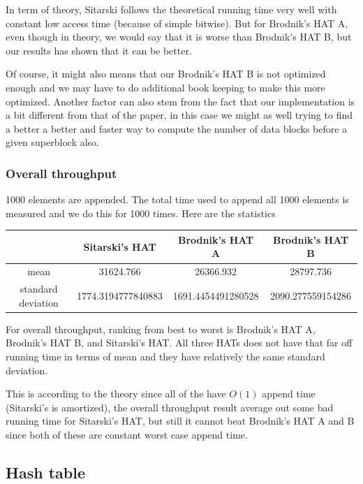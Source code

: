\documentclass{article} %
\begin{document}
    In term of theory, Sitarski follows the theoretical running time very well with constant low access time (because of simple bitwise).
    But for Brodnik's HAT A, even though in theory, we would say that it is worse than Brodnik's HAT B, but our results has shown that it can be better.

    Of course, it might also means that our Brodnik's HAT B is not optimized enough and we may have to do additional book keeping to make this more optimized.
    Another factor can also stem from the fact that our implementation is a bit different from that of the paper, in this case we might as well trying to find a better
    a better and faster way to compute the number of data blocks before a given superblock also.

    \subsubsection*{Overall throughput}
    1000 elements are appended. The total time used to append all 1000 elements is measured and we do this for 1000 times.
    Here are the statistics
    \begin{center}
        \begin{tabular}{|c|c|c|c|}\hline
        & Sitarski's HAT & Brodnik's HAT A & Brodnik's HAT B\\\hline
        mean &  31624.766 & 26366.932 & 28797.736\\\hline
        standard deviation & 1774.3194777840883  & 1691.4454491280528 & 2090.277559154286\\\hline
        \end{tabular}
    \end{center}
    For overall throughput, ranking from best to worst is Brodnik's HAT A, Brodnik's HAT B, and Sitarski's HAT.
    All three HATs does not have that far off running time in terms of mean and they have relatively the same standard deviation.

    This is according to the theory since all of the have $O(1)$ append time (Sitarski's is amortized), the overall throughput result
    average out some bad running time for Sitarski's HAT, but still it cannot beat Brodnik's HAT A and B since both of these are constant worst case append time.


    \subsection*{Hash table}
\end{document}

